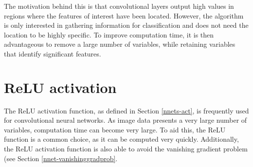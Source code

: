 The motivation behind this is that convolutional layers output high values in regions where the features of interest have been located. However, the algorithm is only interested in gathering information for classification and does not need the location to be highly specific. To improve computation time, it is then advantageous to remove a large number of variables, while retaining variables that identify significant features.

\section{ReLU activation}\label{convnets-act}

The ReLU activation function, as defined in Section \ref{nnets-act}, is frequently used for  convolutional neural networks. As image data presents a very large number of variables, computation time can become very large. To aid this, the ReLU function is a common choice, as it can be computed very quickly. Additionally, the ReLU activation function is also able to avoid the vanishing gradient problem (see Section \ref{nnet-vanishinggradprob}.


%
%


%
%
%
%


